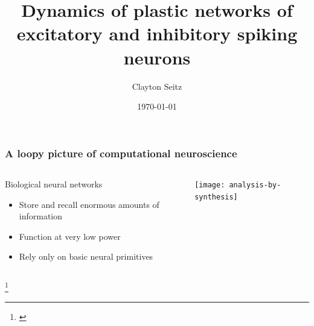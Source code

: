 \documentclass[aspectratio=169]{beamer}
\begin{document}
\title{Dynamics of plastic networks of excitatory and inhibitory spiking neurons}  
\author{Clayton Seitz}
\date{\today} 


\begin{frame}[plain]
\titlepage
\end{frame}

\begin{frame}[plain]
\frametitle{A loopy picture of computational neuroscience}

\begin{columns}

\begin{column}{0.4\textwidth}  %
Biological neural networks

\begin{itemize}
\item Store and recall enormous amounts of information
\item Function at very low power
\item Rely only on basic neural primitives
\end{itemize}


\end{column}

\begin{column}{0.6\textwidth}
\begin{center}
\texttt{[image: analysis-by-synthesis]}
\end{center}
\end{column}

\end{columns}

\footnote{\cite{peirera}}

\end{frame}
\end{document}
